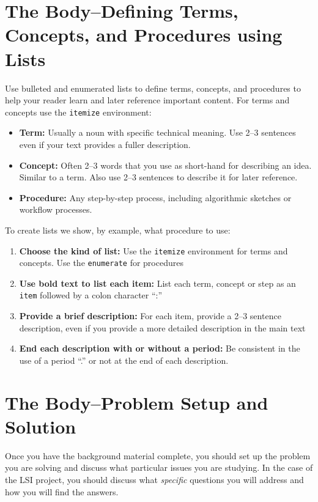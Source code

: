 \documentclass{IEEEtran}
\begin{document}
\section{The Body--Defining Terms, Concepts, and Procedures using Lists}

Use bulleted and enumerated lists to define terms, concepts, and procedures to help your reader learn and later reference important content.  For terms and concepts use the \texttt{itemize} environment:
\begin{itemize}
    \item \textbf{Term:} Usually a noun with specific technical meaning.  Use 2--3 sentences even if your text provides a fuller description.
    \item \textbf{Concept:} Often 2--3 words that you use as short-hand for describing an idea.  Similar to a term.  Also use 2--3 sentences to describe it for later reference.
    \item \textbf{Procedure:} Any step-by-step process, including algorithmic sketches or workflow processes.
\end{itemize}

To create lists we show, by example, what procedure to use:
\begin{enumerate}
    \item \textbf{Choose the kind of list:} Use the \texttt{itemize} environment for terms and concepts.  Use the \texttt{enumerate} for procedures
    \item \textbf{Use bold text to list each item:} List each term, concept or step as an \texttt{\\item} followed by a colon character ``:''
    \item \textbf{Provide a brief description:} For each item, provide a 2--3 sentence description, even if you provide a more detailed description in the main text
    \item \textbf{End each description with or without a period:} Be consistent in the use of a period ``.'' or not at the end of each description. 
\end{enumerate}

\section{The Body--Problem Setup and Solution}

Once you have the background material complete, you should set up the problem you are solving and discuss what particular issues you are studying.  In the case of the LSI project, you should discuss what { \it specific } questions you will address and how you will find the answers.
\end{document}
